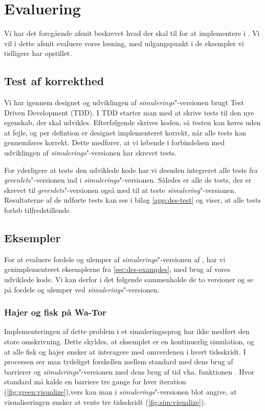 \section{Evaluering}
\label{sec:des-eval}
Vi har  det foregående afsnit beskrevet hvad der skal til for at implementere \des i \pycsp. Vi vil i dette afsnit evaluere vores løsning, med udgangspunkt i de eksempler vi tidligere har opstillet. 
\subsection{Test af korrekthed}
  Vi har igennem designet og udviklingen af \emph{simulerings}"-versionen brugt Test Driven Development (TDD). I TDD starter man med at skrive tests til den nye egenskab, der skal udvikles. Efterfølgende skrives koden, så testen kan køres uden at fejle, og per defintion er designet implementeret korrekt, når alle tests kan gennemføres korrekt. Dette medfører, at vi løbende i forbindelsen med udviklingen af \emph{simulerings}"-versionen har skrevet tests. 
  
  For yderligere at teste den udviklede kode har vi desuden integreret alle tests fra \emph{greenlets}"-versionen ind i \emph{simulerings}"-versionen. Således er alle de tests, der er skrevet til \emph{greenlets}"-versionen også med til at teste \emph{simulering}"-versionen. Resultaterne af de udførte tests kan ses i bilag \ref{app:des-test} og viser, at alle tests forløb tilfredstillende.
  
\subsection{Eksempler}
For at evaluere fordele og ulemper af \emph{simulerings}"-versionen af \pycsp, har vi genimplementeret eksemplerne fra \cref{sec:des-examples}, med  brug af vores udviklede kode. Vi kan derfor i det følgende sammenholde de to versioner og se på fordele og ulemper ved \emph{simulerings}"-versionen.
 
\subsubsection{Hajer og fisk på Wa-Tor}
Implementeringen af dette problem  i et simuleringssprog har ikke medført den store omskrivning. Dette skyldes, at eksemplet er en kontinuerlig simulation, og at alle fisk og hajer ønsker at interagere med omverdenen i hvert tidsskridt. I processen  ser man tydeligst forskellen mellem standard \pycsp med dens brug af barrierer og \emph{simulerings}"-versionen med dens brug af tid vha. funktionen . Hvor standard \pycsp må kalde en barriere tre gange for hver iteration (\cref{fig:green:visualize}),vers kan man i \emph{simulerings}"-versionen blot angive, at visualiseringen ønsker at vente tre tidsskridt (\cref{fig:sim:visualize}). 

